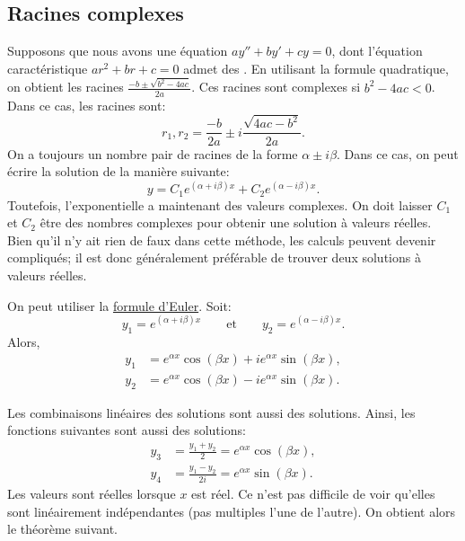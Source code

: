 \subsection{Racines complexes}

Supposons que nous avons une équation  $ay'' + by' + cy = 0$, dont  l'équation caractéristique 
$a r^2 + b r + c = 0$ admet des .
En utilisant la formule quadratique, on obtient les racines 
$\frac{-b \pm \sqrt{b^2 - 4ac}}{2a}$.
Ces racines sont complexes si $b^2 - 4ac < 0$.  
Dans ce cas, les racines sont:
\begin{equation*}
	r_1, r_2 = \frac{-b}{2a} \pm i\frac{\sqrt{4ac - b^2}}{2a} .
\end{equation*}
On a toujours un nombre pair de racines de la forme $\alpha \pm i \beta$. 
Dans ce cas, on peut écrire la solution de la manière suivante:
\begin{equation*}
	y = C_1 e^{(\alpha+i\beta)x} + C_2 e^{(\alpha-i\beta)x} .
\end{equation*}
Toutefois, l'exponentielle a maintenant des valeurs complexes. On doit laisser  
$C_1$ et $C_2$ être des nombres complexes pour obtenir une solution à valeurs réelles. Bien qu'il n'y ait rien de faux dans cette méthode, les calculs peuvent devenir compliqués; il est donc généralement préférable de trouver deux solutions à valeurs réelles.

On peut utiliser la  \hyperref[eulersformula]{formule d'Euler}. Soit: 
\begin{equation*}
	y_1 = e^{(\alpha+i\beta)x} \qquad \text{et} \qquad y_2 = e^{(\alpha-i\beta)x} .
\end{equation*}
Alors,  
\begin{align*}
	y_1 & = e^{\alpha x} \cos (\beta x) + i e^{\alpha x} \sin (\beta x) , \\
	y_2 & = e^{\alpha x} \cos (\beta x) - i e^{\alpha x} \sin (\beta x) .
\end{align*}

Les combinaisons linéaires des solutions sont aussi des solutions. Ainsi, les fonctions suivantes sont aussi des solutions:
\begin{align*}
	y_3 & = \frac{y_1 + y_2}{2} = e^{\alpha x} \cos (\beta x),  \\ 
	y_4 & = \frac{y_1 - y_2}{2i} = e^{\alpha x} \sin (\beta x) .
\end{align*}
Les valeurs sont réelles lorsque $x$ est réel. Ce n'est pas difficile de voir qu'elles sont linéairement indépendantes (pas multiples l'une de l'autre). On obtient alors le théorème suivant.

